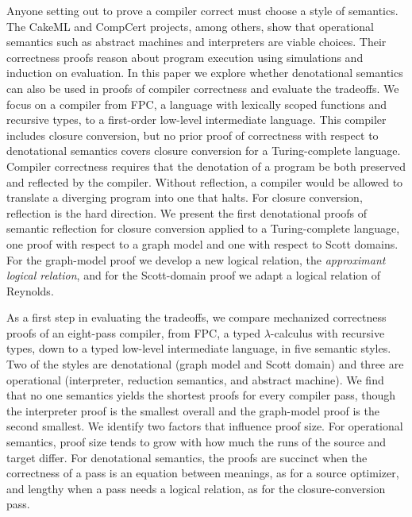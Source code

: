 
Anyone setting out to prove a compiler correct must choose a style of
semantics.  The CakeML and CompCert projects, among others, show that
operational semantics such as abstract machines and interpreters are
viable choices. Their correctness proofs reason about program
execution using simulations and induction on evaluation. In this paper
we explore whether denotational semantics can also be used in proofs
of compiler correctness and evaluate the tradeoffs.  We focus on a
compiler from FPC, a language with lexically scoped functions and
recursive types, to a first-order low-level intermediate language.
This compiler includes closure conversion, but no prior proof of
correctness with respect to denotational semantics covers closure
conversion for a Turing-complete language.  Compiler correctness
requires that the denotation of a program be both preserved and
reflected by the compiler. Without reflection, a compiler would be
allowed to translate a diverging program into one that halts.  For
closure conversion, reflection is the hard direction. We present the
first denotational proofs of semantic reflection for closure
conversion applied to a Turing-complete language, one proof with
respect to a graph model and one with respect to Scott domains. For
the graph-model proof we develop a new logical relation, the
\emph{approximant logical relation}, and for the Scott-domain proof we
adapt a logical relation of Reynolds.

As a first step in evaluating the tradeoffs, we compare mechanized
correctness proofs of an eight-pass compiler, from FPC, a typed
$\lambda$-calculus with recursive types, down to a typed low-level
intermediate language, in five semantic styles. Two of the styles are
denotational (graph model and Scott domain) and three are operational
(interpreter, reduction semantics, and abstract machine). We find that
no one semantics yields the shortest proofs for every compiler pass,
though the interpreter proof is the smallest overall and the
graph-model proof is the second smallest.  We identify two factors
that influence proof size. For operational semantics, proof size tends
to grow with how much the runs of the source and target differ.  For
denotational semantics, the proofs are succinct when the correctness
of a pass is an equation between meanings, as for a source optimizer,
and lengthy when a pass needs a logical relation, as for the
closure-conversion pass.
